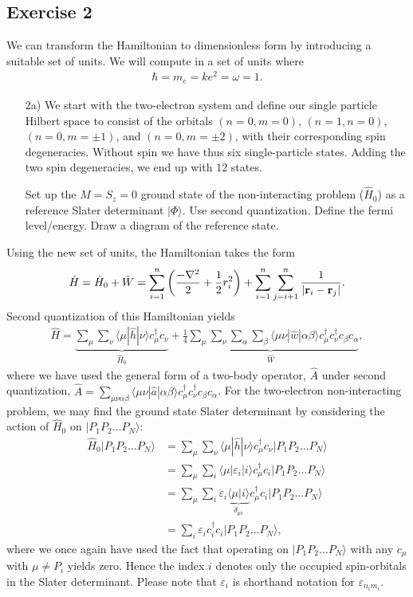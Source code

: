 \documentclass[a4paper]{article}
\newcommand{\nn}{\nonumber}
\newcommand{\slater}{|P_1P_2\dots P_N\rangle}
\newcommand{\cn}{c_\nu}
\newcommand{\cmd}{c_\mu^\dagger}
\newcommand{\cnd}{c_\nu^\dagger}
\newcommand{\ca}{c_\alpha}
\newcommand{\cb}{c_\beta}
\begin{document}
\newpage
\subsection*{Exercise 2}
We can transform the Hamiltonian to dimensionless form by introducing a suitable set of units. We will compute in a set of units where
\begin{align}
\hbar=m_e=ke^2=\omega=1.
\end{align}
\begin{exframe}
\begin{itemize}
  \item[2a)] We start with the two-electron system and define our single particle Hilbert space to consist of the orbitals $(n=0,m=0)$, $(n=1,n=0)$, $(n=0, m=\pm1)$, and $(n=0, m=\pm2)$, with their corresponding spin degeneracies. Without spin we have thus six single-particle states. Adding the two spin degeneracies, we end up with $12$ states.

  Set up the $M=S_z=0$ ground state of the non-interacting problem ($\hat{H}_0$) as a reference Slater determinant $|\Phi\rangle$. Use second quantization. Define the fermi level/energy. Draw a diagram of the reference state.
\end{itemize}
\end{exframe}
Using the new set of units, the Hamiltonian takes the form 
\begin{align}
\hat{H} = \hat{H}_0 + \hat{W} = \sum_{i=1}^n \left( \frac{-\nabla^2}{2} +\frac{1}{2}r_i^2\right) + \sum_{i=1}^n\sum_{j=i+1}^n\frac{1}{|{\bf r}_i-{\bf r}_j|}.
\end{align}
Second quantization of this Hamiltonian yields
\begin{align}
\hat{H} = \underbrace{\sum_\mu\sum_\nu \langle \mu | \hat{h} | \nu \rangle \cmd \cn}_{\hat{H}_0} + \underbrace{\frac{1}{4}\sum_\mu\sum_\nu\sum_\alpha\sum_\beta \langle \mu\nu|\hat{w}| \alpha \beta \rangle \cmd\cnd \cb\ca}_{\hat{W}}, \label{eq:3}
\end{align}
where we have used the general form of a two-body operator, $\hat{A}$ under second quantization, $\hat{A}=\sum_{\mu\nu\alpha\beta} \langle \mu\nu|\hat{a}|\alpha\beta\rangle \cmd\cnd\cb\ca$. For the two-electron non-interacting problem, we may find the ground state Slater determinant by considering the action of $\hat{H}_0$ on $\slater$:
\begin{align}
\hat{H}_0 \slater &= \sum_\mu\sum_\nu \langle \mu | \hat{h} | \nu \rangle \cmd \cn \slater \nn\\
                  &= \sum_\mu\sum_i \langle \mu | \varepsilon_i | i \rangle \cmd c_i \slater \nn\\
                  &= \sum_\mu\sum_i \varepsilon_i \underbrace{\langle \mu | i \rangle}_{\delta_{\mu i}} \cmd c_i \slater \nn\\
                  &= \sum_i \varepsilon_i c_i^\dagger c_i \slater,
\end{align}
where we once again have used the fact that operating on $\slater$ with any $c_\mu$ with $\mu\not=P_i$ yields zero. Hence the index $i$ denotes only the occupied spin-orbitals in the Slater determinant. Please note that $\varepsilon_i$ is shorthand notation for $\varepsilon_{n_i m_i}$. 
\end{document}
